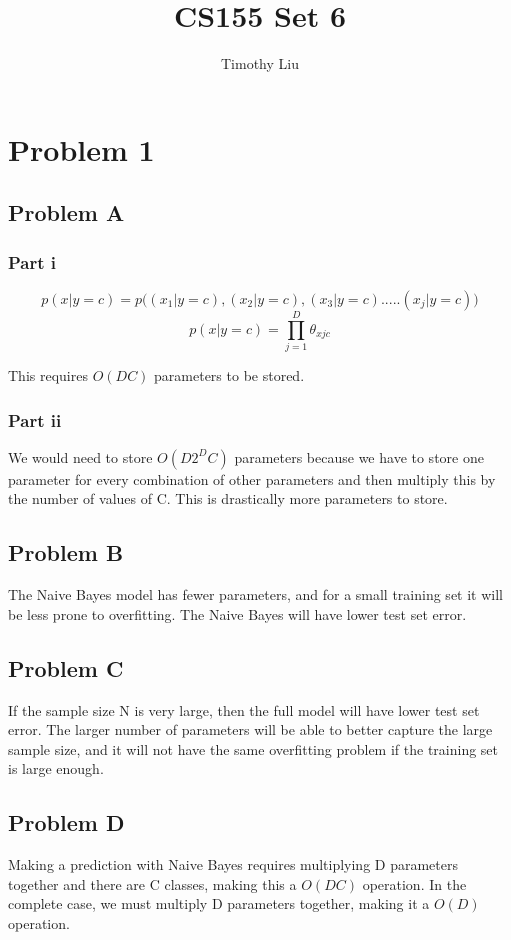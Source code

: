 \documentclass[12pt]{article} %
\title{CS155 Set 6}
\author{Timothy Liu}
\begin{document}
\maketitle

\newpage

\section{Problem 1}
\subsection{Problem A}
\subsubsection{Part i}

$$p(x|y = c) = p\bigg((x_1|y=c), (x_2|y=c), (x_3|y = c).....(x_j|y=c)\bigg)$$
$$p(x|y = c) = \prod_{j=1}^D \theta_{xjc}$$

This requires $O(DC)$ parameters to be stored.

\subsubsection{Part ii}
We would need to store $O(D 2^D C)$ parameters because we have to store one parameter for every combination of other parameters and then multiply this by the number of values of C. This is drastically more parameters to store.

\subsection{Problem B}
The Naive Bayes model has fewer parameters, and for a small training set it will be less prone to overfitting. The Naive Bayes will have lower test set error.

\subsection{Problem C}
If the sample size N is very large, then the full model will have lower test set error. The larger number of parameters will be able to better capture the large sample size, and it will not have the same overfitting problem if the training set is large enough.

\subsection{Problem D}
Making a prediction with Naive Bayes requires multiplying D parameters together and there are C classes, making this a $O(DC)$ operation.  In the complete case, we must multiply D parameters together, making it a $O(D)$ operation.
\end{document}
